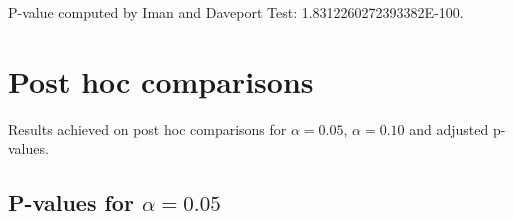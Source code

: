 \documentclass[a4paper,10pt]{article}
\begin{document}
\begin{landscape}
P-value computed by Iman and Daveport Test: 1.8312260272393382E-100.\newline



\pagebreak

\section{Post hoc comparisons}

Results achieved on post hoc comparisons for $\alpha = 0.05$, $\alpha = 0.10$ and adjusted p-values.

\subsection{P-values for $\alpha=0.05$}


\end{landscape}
\end{document}
